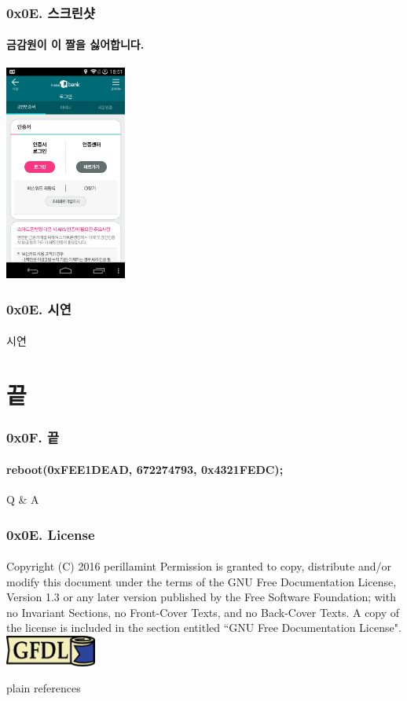 \begin{frame}
  \frametitle{0x0E. 스크린샷}
  \framesubtitle{금감원이 이 짤을 싫어합니다.}

  \begin{center}
    \includegraphics [width=40mm]{img/Hana1QrootBypass.png}
  \end{center}
\end{frame}

\begin{frame}
  \frametitle{0x0E. 시연}
  \framesubtitle{}

  \begin{center}
  시연
  \end{center}
\end{frame}

\section[Section]{끝}
\begin{frame}
  \frametitle{0x0F. 끝}
  \framesubtitle{reboot(0xFEE1DEAD, 672274793, 0x4321FEDC);}

  \begin{center}
    Q \& A
  \end{center}
\end{frame}

\begin{frame}
  \frametitle{0x0E. License}
  \framesubtitle{}
  Copyright (C)  2016 perillamint\linebreak
  Permission is granted to copy, distribute and/or modify this document
  under the terms of the GNU Free Documentation License, Version 1.3
  or any later version published by the Free Software Foundation;\linebreak
  with no Invariant Sections, no Front-Cover Texts, and no Back-Cover Texts.
  A copy of the license is included in the section entitled ``GNU
  Free Documentation License".
  \linebreak
  \linebreak
  \linebreak
  \linebreak
  \includegraphics [width=30mm]{img/gfdl-logo-small.png}
\end{frame}

 {plain}
 {references}



